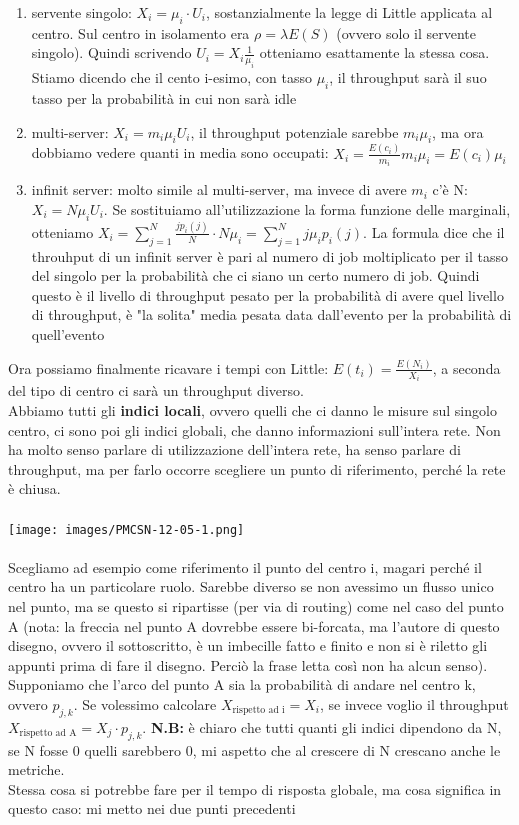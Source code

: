 \documentclass{article}
\begin{document}
\begin{enumerate}
\item servente singolo: $X_i = \mu_i \cdot U_i$, sostanzialmente la legge di Little applicata al centro. Sul centro in isolamento era $\rho = \lambda E(S)$ (ovvero solo il servente singolo). Quindi scrivendo $U_i = X_i \frac{1}{\mu_i}$ otteniamo esattamente la stessa cosa. Stiamo dicendo che il cento i-esimo, con tasso $\mu_i$, il throughput sarà il suo tasso per la probabilità in cui non sarà idle
\item multi-server: $X_i = m_i\mu_i U_i$, il throughput potenziale sarebbe $m_i \mu_i$, ma ora dobbiamo vedere quanti in media sono occupati: $X_i = \frac{E(c_i)}{m_i} m_i \mu_i = E(c_i) \mu_i$
\item infinit server: molto simile al multi-server, ma invece di avere $m_i$ c'è N: $X_i = N \mu_i U_i$. Se sostituiamo all'utilizzazione la forma funzione delle marginali, otteniamo $X_i = \sum\limits_{j=1}^{N} \frac{jp_i(j)}{N} \cdot N\mu_i = \sum\limits_{j=1}^{N} j\mu_ip_i(j)$. La formula dice che il throuhput di un infinit server è pari al numero di job moltiplicato per il tasso del singolo per la probabilità che ci siano un certo numero di job. Quindi questo è il livello di throughput pesato per la probabilità di avere quel livello di throughput, è "la solita" media pesata data dall'evento per la probabilità di quell'evento
\end{enumerate}
Ora possiamo finalmente ricavare i tempi con Little: $E(t_i) = \frac{E(N_i)}{X_i}$, a seconda del tipo di centro ci sarà un throughput diverso.\\ Abbiamo tutti gli \textbf{indici locali}, ovvero quelli che ci danno le misure sul singolo centro, ci sono poi gli indici globali, che danno informazioni sull'intera rete. Non ha molto senso parlare di utilizzazione dell'intera rete, ha senso parlare di throughput, ma per farlo occorre scegliere un punto di riferimento, perché la rete è chiusa.\\\\
\texttt{[image: images/PMCSN-12-05-1.png]}\\\\
Scegliamo ad esempio come riferimento il punto del centro i, magari perché il centro ha un particolare ruolo. Sarebbe diverso se non avessimo un flusso unico nel punto, ma se questo si ripartisse (per via di routing) come nel caso del punto A (nota: la freccia nel punto A dovrebbe essere bi-forcata, ma l'autore di questo disegno, ovvero il sottoscritto, è un imbecille fatto e finito e non si è riletto gli appunti prima di fare il disegno. Perciò la frase letta così non ha alcun senso). Supponiamo che l'arco del punto A sia la probabilità di andare nel centro k, ovvero $p_{j,k}$. Se volessimo calcolare $X_{\text{rispetto ad i}} = X_i$, se invece voglio il throughput $X_{\text{rispetto ad A}} = X_j \cdot p_{j,k}$. \textbf{N.B: }è chiaro che tutti quanti gli indici dipendono da N, se N fosse 0 quelli sarebbero 0, mi aspetto che al crescere di N crescano anche le metriche.\\ Stessa cosa si potrebbe fare per il tempo di risposta globale, ma cosa significa in questo caso: mi metto nei due punti precedenti
\end{document}
